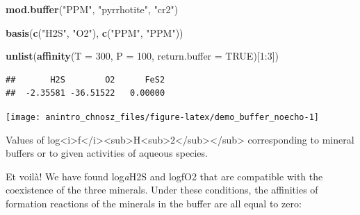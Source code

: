 \documentclass[]{tufte-book}
\newenvironment{Shaded}{}{}
\newcommand{\KeywordTok}[1]{\textcolor[rgb]{0.00,0.44,0.13}{\textbf{#1}}}
\newcommand{\DataTypeTok}[1]{\textcolor[rgb]{0.56,0.13,0.00}{#1}}
\newcommand{\DecValTok}[1]{\textcolor[rgb]{0.25,0.63,0.44}{#1}}
\newcommand{\StringTok}[1]{\textcolor[rgb]{0.25,0.44,0.63}{#1}}
\newcommand{\OtherTok}[1]{\textcolor[rgb]{0.00,0.44,0.13}{#1}}
\newcommand{\OperatorTok}[1]{\textcolor[rgb]{0.40,0.40,0.40}{#1}}
\newcommand{\NormalTok}[1]{#1}
\begin{document}
\begin{Shaded}
\begin{Highlighting}[]
\KeywordTok{mod.buffer}\NormalTok{(}\StringTok{"PPM"}\NormalTok{, }\StringTok{"pyrrhotite"}\NormalTok{, }\StringTok{"cr2"}\NormalTok{)}
\end{Highlighting}
\end{Shaded}

\begin{Shaded}
\begin{Highlighting}[]
\KeywordTok{basis}\NormalTok{(}\KeywordTok{c}\NormalTok{(}\StringTok{"H2S"}\NormalTok{, }\StringTok{"O2"}\NormalTok{), }\KeywordTok{c}\NormalTok{(}\StringTok{"PPM"}\NormalTok{, }\StringTok{"PPM"}\NormalTok{))}
\end{Highlighting}
\end{Shaded}

\begin{Shaded}
\begin{Highlighting}[]
\KeywordTok{unlist}\NormalTok{(}\KeywordTok{affinity}\NormalTok{(}\DataTypeTok{T =} \DecValTok{300}\NormalTok{, }\DataTypeTok{P =} \DecValTok{100}\NormalTok{, }\DataTypeTok{return.buffer =} \OtherTok{TRUE}\NormalTok{)[}\DecValTok{1}\OperatorTok{:}\DecValTok{3}\NormalTok{])}
\end{Highlighting}
\end{Shaded}

\begin{verbatim}
##       H2S        O2      FeS2 
##  -2.35581 -36.51522   0.00000
\end{verbatim}

\begin{marginfigure}
\texttt{[image: anintro\_chnosz\_files/figure-latex/demo\_buffer\_noecho-1]} \caption[Values of log<i>f</i><sub>H<sub>2</sub></sub> corresponding to mineral buffers or to given activities of aqueous species]{Values of log<i>f</i><sub>H<sub>2</sub></sub> corresponding to mineral buffers or to given activities of aqueous species.}\label{fig:demo_buffer_noecho}
\end{marginfigure}

Et voilà! We have found log\emph{a}H2S and logfO2 that are compatible
with the coexistence of the three minerals. Under these conditions, the
affinities of formation reactions of the minerals in the buffer are all
equal to zero:

\begin{Shaded}
\end{Shaded}
\end{document}
